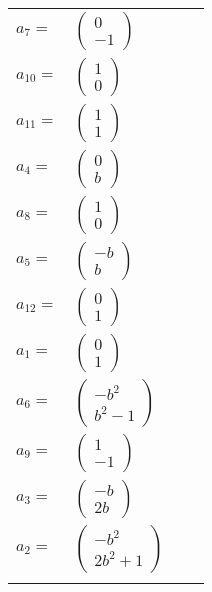 \documentclass[1p]{elsarticle_modified}
\theoremstyle{definition}
\begin{document}
\begin{tabular}{m{7pt} m{180pt} m{7pt} m{180pt} }
\flushright $a_{7}=$&$\begin{pmatrix}0\\-1\end{pmatrix}$ \\
\flushright $a_{10}=$&$\begin{pmatrix}1\\0\end{pmatrix}$ \\
\flushright $a_{11}=$&$\begin{pmatrix}1\\1\end{pmatrix}$ \\
\flushright $a_{4}=$&$\begin{pmatrix}0\\b\end{pmatrix}$ \\
\flushright $a_{8}=$&$\begin{pmatrix}1\\0\end{pmatrix}$ \\
\flushright $a_{5}=$&$\begin{pmatrix}- b\\b\end{pmatrix}$ \\
\flushright $a_{12}=$&$\begin{pmatrix}0\\1\end{pmatrix}$ \\
\flushright $a_{1}=$&$\begin{pmatrix}0\\1\end{pmatrix}$ \\
\flushright $a_{6}=$&$\begin{pmatrix}- b^2\\b^2-1\end{pmatrix}$ \\
\flushright $a_{9}=$&$\begin{pmatrix}1\\-1\end{pmatrix}$ \\
\flushright $a_{3}=$&$\begin{pmatrix}- b\\2 b\end{pmatrix}$ \\
\flushright $a_{2}=$&$\begin{pmatrix}- b^2\\2 b^2+1\end{pmatrix}$\\&\end{tabular}
\end{document}
